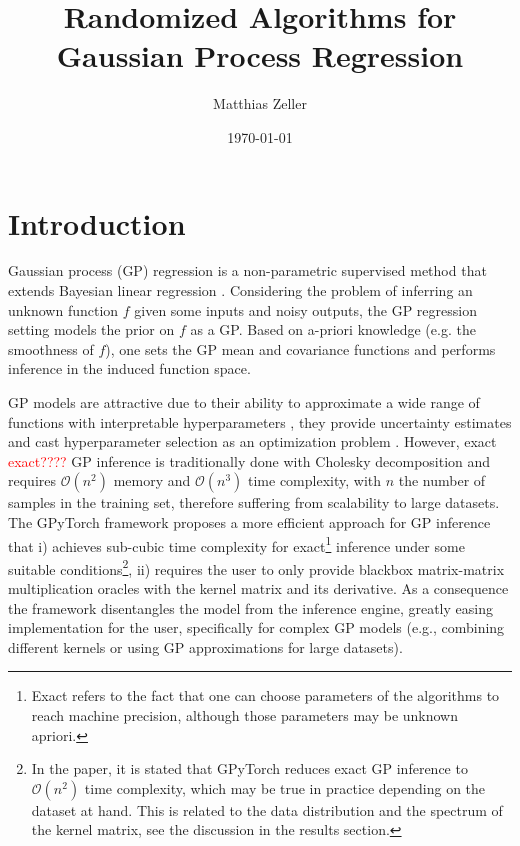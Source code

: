\documentclass{article}
\title{
    {\huge \textbf{Randomized Algorithms for \\Gaussian Process Regression}}\\
}
\author{Matthias Zeller}
\date{\today}
\begin{document}
\maketitle

\section{Introduction}

Gaussian process (GP) regression is a non-parametric supervised method that extends Bayesian linear regression \cite{schulz_tutorial_2018, rasmussen_gaussian_2005, liu_when_2019, deringer_gaussian_2021}.
Considering the problem of inferring an unknown function $f$ given some inputs and noisy outputs, the GP regression setting models the prior on $f$ as a GP. Based on a-priori knowledge (e.g. the smoothness of $f$), one sets the GP mean and covariance functions and performs inference in the induced function space. 

GP models are attractive due to their ability to approximate a wide range of functions with interpretable hyperparameters \cite{rasmussen_gaussian_2005, belyaev_exact_2014},
they provide uncertainty estimates \cite{rasmussen_gaussian_2005, seeger_gaussian_2004}
and cast hyperparameter selection as an optimization problem \cite{gorbach_model_2017, rasmussen_gaussian_2005, seeger_gaussian_2004}.
However, exact \textcolor{red}{exact????} GP inference is traditionally done with Cholesky decomposition and requires $\mathcal O(n^2)$ memory and $\mathcal O(n^3)$ time complexity, with $n$ the number of samples in the training set, therefore suffering from scalability to large datasets. The GPyTorch framework \cite{gardner_gpytorch_2021} proposes a more efficient approach for GP inference that i) achieves sub-cubic time complexity for exact\footnote{Exact refers to the fact that one can choose parameters of the algorithms to reach machine precision, although those parameters may be unknown apriori.} inference under some suitable conditions\footnote{In the paper, it is stated that GPyTorch reduces exact GP inference to $\mathcal O(n^2)$ time complexity, which may be true in practice depending on the dataset at hand. This is related to the data distribution and the spectrum of the kernel matrix, see the discussion in the results section.}, ii) requires the user to only provide blackbox matrix-matrix multiplication oracles with the kernel matrix and its derivative.
As a consequence the framework disentangles the model from the inference engine, greatly easing implementation for the user, specifically for complex GP models (e.g., combining different kernels or using GP approximations for large datasets). 
\end{document}
